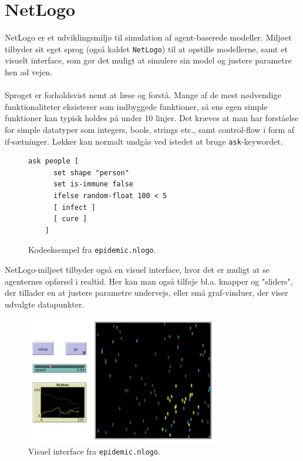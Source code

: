 \documentclass{article}
\begin{document}
\section{NetLogo}
NetLogo er et udviklingsmiljø til simulation af agent-baserede modeller. Miljøet tilbyder sit eget sprog (også kaldet \texttt{NetLogo}) til at opstille modellerne, samt et visuelt interface, som gør det muligt at simulere sin model og justere parametre hen ad vejen.\\\\
Sproget er forholdsvist nemt at læse og forstå. Mange af de mest nødvendige funktionaliteter eksisterer som indbyggede funktioner, så ens egen simple funktioner kan typisk holdes på under 10 linjer. Det kræves at man har forståelse for simple datatyper som integers, bools, strings etc., samt control-flow i form af if-sætninger. Løkker kan normalt undgås ved istedet at bruge \texttt{ask}-keywordet.
\begin{figure}[H]
  \begin{lstlisting}[frame=single]
    ask people [
      set shape "person"
      set is-immune false
      ifelse random-float 100 < 5
      [ infect ]
      [ cure ]
    ]
  \end{lstlisting}
  \caption{Kodeeksempel fra \texttt{epidemic.nlogo}.}
\end{figure}
NetLogo-miljøet tilbyder også en visuel interface, hvor det er muligt at se agenternes opførsel i realtid. Her kan man også tilføje bl.a. knapper og "sliders", der tillader en at justere parametre undervejs, eller små graf-vinduer, der viser udvalgte datapunkter.
\begin{figure}[H]
  \centering
  \includegraphics[width=0.75\textwidth]{epidemic_netlogo.png}
  \caption{Visuel interface fra \texttt{epidemic.nlogo}.}
\end{figure}
\end{document}
